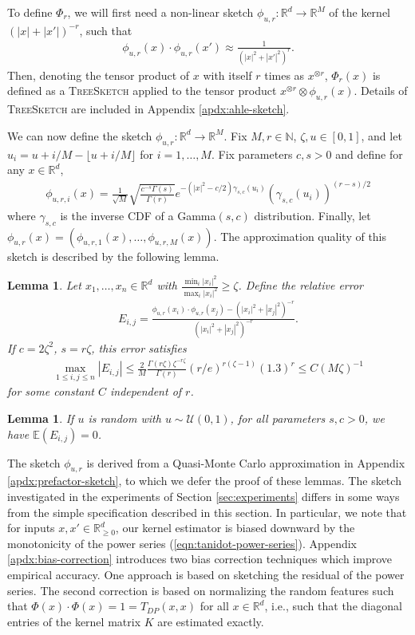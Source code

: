 \documentclass{article}
\theoremstyle{plain}
\newtheorem{lemma}[theorem]{Lemma}
\theoremstyle{definition}
\theoremstyle{remark}
\newcommand{\numeq}[1]{\begin{align}#1\end{align}}
\newcommand{\eq}[1]{\begin{align*}#1\end{align*}}
\newcommand{\E}{\mathbb{E}}
\newcommand{\R}{\mathbb{R}}
\begin{document}
To define $\Phi_r$, we will first need a non-linear sketch $\phi_{u,r}:\R^d\to\R^M$ of the kernel $(|x|+|x'|)^{-r}$, such that 
\eq{
\phi_{u,r}(x) \cdot \phi_{u,r}(x') \approx \frac{1}{(|x|^2+|x'|^2)^r}.
}
Then, denoting the tensor product of $x$ with itself $r$ times as $x^{\otimes r}$,
$\Phi_r(x)$ is defined as a \textsc{TreeSketch} applied to the tensor product $x^{\otimes r}\otimes \phi_{u,r}(x)$. Details of \textsc{TreeSketch} are included in Appendix \ref{apdx:ahle-sketch}. 

We can now define the sketch $\phi_{u,r}:\R^d\to\R^M$. Fix $M,r\in\mathbb{N}$, $\zeta,u\in[0,1]$, and let $u_i = u + i/M - \lfloor u + i/M\rfloor$ for $i=1,\dots,M$. Fix parameters $c,s>0$ and define for any $x\in\R^d$,
\eq{
\phi_{u,r,i}(x) =\frac{1}{\sqrt M}\sqrt{\frac{c^{-s}\Gamma(s)}{\Gamma(r)} } e^{-(|x|^2-c/2)\gamma_{s,c}(u_i) }(\gamma_{s,c}(u_i))^{(r-s)/2}
}
\sloppy where $\gamma_{s,c}$ is the inverse CDF of a Gamma$(s,c)$ distribution. Finally, let $\phi_{u,r}(x) = (\phi_{u,r,1}(x),\dots,\phi_{u,r,M}(x))$. The approximation quality of this sketch is described by the following lemma.
 
 \begin{lemma} \label{QMC error}
Let $x_1,\dots,x_n\in \R^d$ with $\frac{\min_i |x_i|^2}{\max_i |x_i|^2} \ge \zeta$. Define the relative error
\numeq{ \label{error matrix}
E_{i,j} = \frac{   \phi_{u,r}(  x_i )\cdot \phi_{u,r}( x_j ) - (| x_i | ^2+ | x_j | ^2)^{-r} }{( | x_i | ^2+ | x_j | ^2)^{-r}} .
}
If $c = 2\zeta^2$, $s=r\zeta$, this error satisfies 
\eq{
\max_{1\le i,j \le n} | E_{i,j}| \leq \frac{2}{M} \frac{\Gamma(r\zeta)\zeta^{-r\zeta}}{\Gamma(r)} (r/e)^{r(\zeta-1)} (1.3)^r \leq C (M\zeta)^{-1}
}
for some constant $C$ independent of $r$. 
\end{lemma}

\begin{lemma} \label{QMC estimator unbiased}
If $u$ is random with $u\sim\mathcal U(0,1)$, for all parameters $s,c>0$, we have $\E(E_{i,j}) = 0$. 
\end{lemma}

The sketch $\phi_{u,r}$ is derived from a Quasi-Monte Carlo approximation in Appendix \ref{apdx:prefactor-sketch}, to which we defer the proof of these lemmas. The sketch investigated in the experiments of Section \ref{sec:experiments} differs in some ways from the simple specification described in this section. In particular, we note that for inputs $x,x'\in\R_{\ge 0}^d$, our kernel estimator is biased downward by the monotonicity of the power series (\ref{eqn:tanidot-power-series}). Appendix \ref{apdx:bias-correction} introduces two bias correction techniques which improve empirical accuracy. One approach is based on sketching the residual of the power series. The second correction is based on normalizing the random features such that $\Phi(x)\cdot\Phi(x)=1 = T_{DP}(x,x)$ for all $x\in\R^d$, i.e., such that the diagonal entries of the kernel matrix $K$ are estimated exactly.
\end{document}
